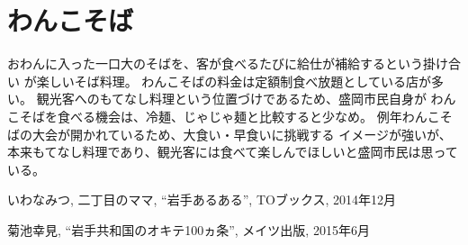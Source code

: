 \documentclass[twocolumn]{jarticle} %
\begin{document}
\section{わんこそば}
おわんに入った一口大のそばを、客が食べるたびに給仕が補給するという掛け合い
が楽しいそば料理。
わんこそばの料金は定額制食べ放題としている店が多い。
観光客へのもてなし料理という位置づけであるため、盛岡市民自身が
わんこそばを食べる機会は、冷麺、じゃじゃ麺と比較すると少なめ。
例年わんこそばの大会が開かれているため、大食い・早食いに挑戦する
イメージが強いが、
本来もてなし料理であり、観光客には食べて楽しんでほしいと盛岡市民は思っている。



\begin{thebibliography}{9}%

いわなみつ, 二丁目のママ, ``岩手あるある'', TOブックス, 2014年12月

菊池幸見, ``岩手共和国のオキテ100ヵ条'', メイツ出版, 2015年6月
\end{thebibliography}
\end{document}
